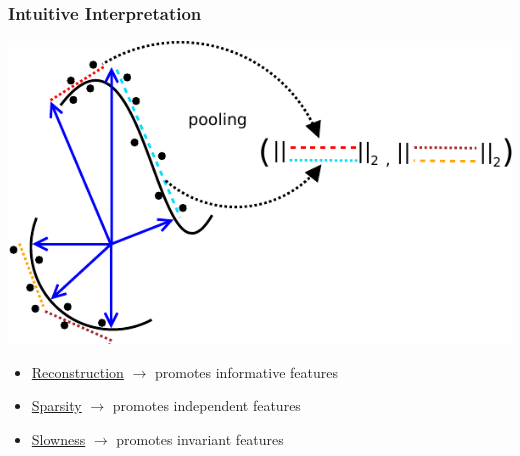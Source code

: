 \documentclass{beamer}
\begin{document}
\begin{frame}
\frametitle{Intuitive Interpretation}
\centering
\includegraphics[scale=0.65]{./Figures/SF2.pdf} \\
\begin{itemize} 
\item{\underline{Reconstruction} $\rightarrow$ promotes informative features}
\item{\underline{Sparsity} $\rightarrow$ promotes independent features}
\item{\underline{Slowness} $\rightarrow$ promotes invariant features}
\end{itemize} 
\end{frame} 
\end{document}
